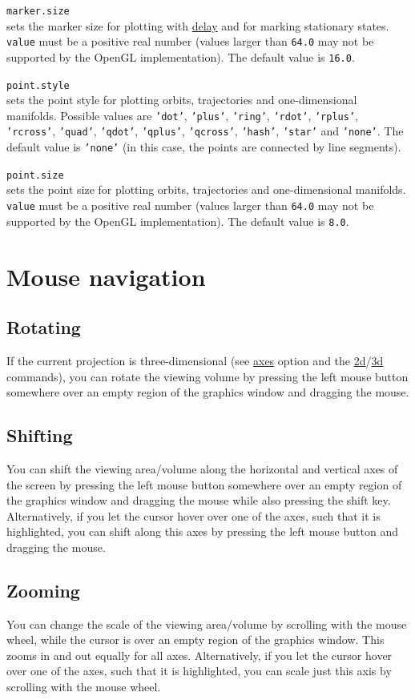 \documentclass[10pt,a4paper,titlepage]{article}
\newcommand{\opt}[2]{\item{\T{\hypertarget{#1}{#1}\index[index]{#1} #2}}}
\newcommand{\HL}[1]{\hyperlink{#1}{#1}}
\newcommand{\T}[1]{\texttt{#1}}
\begin{document}
\begin{description}
\opt{marker.size}{}\\
sets the marker size for plotting with \HL{delay} and for marking stationary states. \T{value} must be a positive real number (values larger than \T{64.0} may not be supported by the OpenGL implementation). The default value is \T{16.0}.
\opt{point.style}{}\\
sets the point style for plotting orbits, trajectories and one-dimensional manifolds. Possible values are \T{'dot'}, \T{'plus'}, \T{'ring'}, \T{'rdot'}, \T{'rplus'}, \T{'rcross'}, \T{'quad'}, \T{'qdot'}, \T{'qplus'}, \T{'qcross'}, \T{'hash'}, \T{'star'} and \T{'none'}. The default value is \T{'none'} (in this case, the points are connected by line segments).
\opt{point.size}{}\\ 
sets the point size for plotting orbits, trajectories and one-dimensional manifolds.  \T{value} must be a positive real number (values larger than \T{64.0} may not be supported by the OpenGL implementation). The default value is \T{8.0}.
\end{description}
 \newpage\section{Mouse navigation}
\label{sec::mouse}
\subsection{Rotating}
If the current projection is three-dimensional (see \HL{axes} option and the \HL{2d}/\HL{3d} commands), you can rotate the viewing volume by pressing the left mouse button somewhere over an empty region of the graphics window and dragging the mouse.
\subsection{Shifting}
You can shift the viewing area/volume along the horizontal and vertical axes of the screen by pressing the left mouse button somewhere over an empty region of the graphics window and dragging the mouse while also pressing the shift key. Alternatively, if you let the cursor hover over one of the axes, such that it is highlighted, you can shift along this axes by pressing the left mouse button and dragging the mouse.
\subsection{Zooming}
You can change the scale of the viewing area/volume by scrolling with the mouse wheel, while the cursor is over an empty region of the graphics window. This zooms in and out equally for all axes. Alternatively, if you let the cursor hover over one of the axes, such that it is highlighted, you can scale just this axis by scrolling with the mouse wheel.
\end{document}
